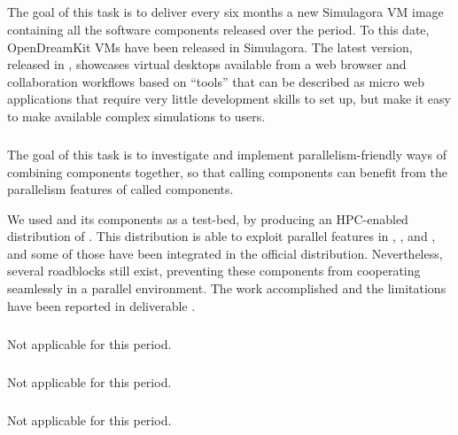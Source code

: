 
  \subparagraph{}
  \label{component-architecture@simulagora-dev}
  The goal of this task is to deliver every six months a new Simulagora
  VM image containing all the software components released over the
  period.
  To this date,  OpenDreamKit VMs have been released in
  Simulagora. The latest version, released in ,
  showcases virtual desktops available from a web browser and
  collaboration workflows based on ``tools'' that can be described as
  micro web applications that require very little development skills
  to set up, but make it easy to make available complex simulations to
  users. 
  
  \subparagraph{}
  The goal of this task is to investigate and implement
  parallelism-friendly ways of combining components together, so that
  calling components can benefit from the parallelism features of
  called components.

  We used \Sage and its components as a test-bed, by producing an
  HPC-enabled distribution of \Sage. This distribution is able to
  exploit parallel features in \Linbox, \GAP, \Singular and \PariGP,
  and some of those have been integrated in the official \Sage
  distribution. Nevertheless, several roadblocks still exist,
  preventing these components from cooperating seamlessly in a
  parallel environment. The work accomplished and the limitations have
  been reported in deliverable  
  .
  
  \subparagraph{}
  \label{component-architecture@extract-smc}
  Not applicable for this period.
  
  \subparagraph{}
  \label{component-architecture@workflow}
  Not applicable for this period.
  
  \subparagraph{}
  \label{component-architecture@oommf-python-interface}
  Not applicable for this period.

  

